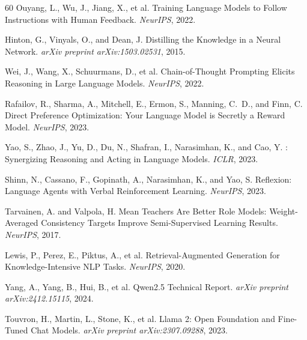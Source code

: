 \documentclass{article}
\begin{document}
\begin{thebibliography}{60}
Ouyang, L., Wu, J., Jiang, X., et al.
\newblock Training Language Models to Follow Instructions with Human Feedback.
\newblock \emph{NeurIPS}, 2022.

Hinton, G., Vinyals, O., and Dean, J.
\newblock Distilling the Knowledge in a Neural Network.
\newblock \emph{arXiv preprint arXiv:1503.02531}, 2015.

Wei, J., Wang, X., Schuurmans, D., et al.
\newblock Chain-of-Thought Prompting Elicits Reasoning in Large Language Models.
\newblock \emph{NeurIPS}, 2022.

Rafailov, R., Sharma, A., Mitchell, E., Ermon, S., Manning, C.~D., and Finn, C.
\newblock Direct Preference Optimization: Your Language Model is Secretly a Reward Model.
\newblock \emph{NeurIPS}, 2023.


Yao, S., Zhao, J., Yu, D., Du, N., Shafran, I., Narasimhan, K., and Cao, Y.
: Synergizing Reasoning and Acting in Language Models.
\newblock \emph{ICLR}, 2023.

Shinn, N., Cassano, F., Gopinath, A., Narasimhan, K., and Yao, S.
\newblock Reflexion: Language Agents with Verbal Reinforcement Learning.
\newblock \emph{NeurIPS}, 2023.


Tarvainen, A. and Valpola, H.
\newblock Mean Teachers Are Better Role Models: Weight-Averaged Consistency Targets Improve Semi-Supervised Learning Results.
\newblock \emph{NeurIPS}, 2017.


Lewis, P., Perez, E., Piktus, A., et al.
\newblock Retrieval-Augmented Generation for Knowledge-Intensive {NLP} Tasks.
\newblock \emph{NeurIPS}, 2020.


Yang, A., Yang, B., Hui, B., et al.
\newblock Qwen2.5 Technical Report.
\newblock \emph{arXiv preprint arXiv:2412.15115}, 2024.

Touvron, H., Martin, L., Stone, K., et al.
\newblock Llama 2: Open Foundation and Fine-Tuned Chat Models.
\newblock \emph{arXiv preprint arXiv:2307.09288}, 2023.


\end{thebibliography}
\end{document}
